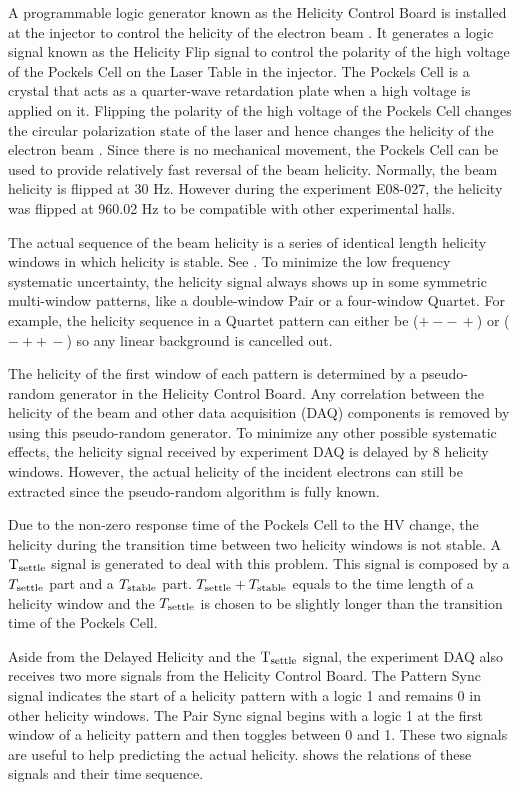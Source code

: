 A programmable logic generator known as the Helicity Control Board is installed at the injector to control the helicity of the electron beam \cite{Flood2010}. It generates a logic signal known as the Helicity Flip signal to control the polarity of the high voltage of the Pockels Cell on the Laser Table in the injector. The Pockels Cell is a crystal that acts as a quarter-wave retardation plate when a high voltage is applied on it. Flipping the polarity of the high voltage of the Pockels Cell changes the circular polarization state of the laser and hence changes the helicity of the electron beam \cite{Hansknecht2007}. Since there is no mechanical movement, the Pockels Cell can be used to provide relatively fast reversal of the beam helicity. Normally, the beam helicity is flipped at 30 Hz. However during the experiment E08-027, the helicity was flipped at 960.02 Hz to be compatible with other experimental halls.

The actual sequence of the beam helicity is a series of identical length helicity windows in which helicity is stable. See . To minimize the low frequency systematic uncertainty, the helicity signal always shows up in some symmetric multi-window patterns, like a double-window Pair or a four-window Quartet. For example, the helicity sequence in a Quartet pattern can either be ($+--\,+$) or ($-++\,-$) so any linear background is cancelled out.

The helicity of the first window of each pattern is determined by a pseudo-random generator in the Helicity Control Board. Any correlation between the helicity of the beam and other data acquisition (DAQ) components is removed by using this pseudo-random generator. To minimize any other possible systematic effects, the helicity signal received by experiment DAQ is delayed by 8 helicity windows. However, the actual helicity of the incident electrons can still be extracted since the pseudo-random algorithm is fully known.

Due to the non-zero response time of the Pockels Cell to the HV change, the helicity during the transition time between two helicity windows is not stable. A $\mathrm{T}_{\mathrm{settle}}$ signal is generated to deal with this problem. This signal is composed by a $T_{\mathrm{settle}}$ part and a $T_{\mathrm{stable}}$ part. $T_{\mathrm{settle}}+T_{\mathrm{stable}}$ equals to the time length of a helicity window and the $T_{\mathrm{settle}}$ is chosen to be slightly longer than the transition time of the Pockels Cell.

Aside from the Delayed Helicity and the $\mathrm{T}_{\mathrm{settle}}$ signal, the experiment DAQ also receives two more signals from the Helicity Control Board. The Pattern Sync signal indicates the start of a helicity pattern with a logic 1 and remains 0 in other helicity windows. The Pair Sync signal begins with a logic 1 at the first window of a helicity pattern and then toggles between 0 and 1. These two signals are useful to help predicting the actual helicity.  shows the relations of these signals and their time sequence.

